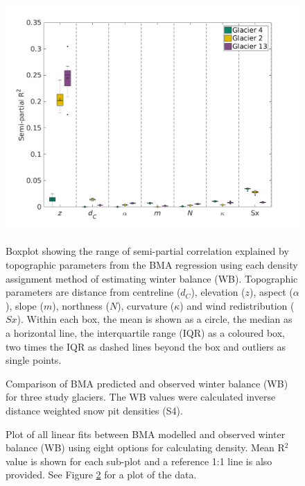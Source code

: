 \documentclass{sfuthesis}
\newcommand{\params}{Topographic parameters are distance from centreline ($d_C$), elevation ($z$), aspect ($\alpha$), slope ($m$), northness ($N$), curvature ($\kappa$) and wind redistribution ($Sx$). }
\newcommand{\boxplot}{Within each box, the mean is shown as a circle, the median as a horizontal line, the interquartile range (IQR) as a coloured box, two times the IQR as dashed lines beyond the box and outliers as single points. }
\begin{document}
\begin{figure}
	\centering
	\includegraphics[width =1.1 \textwidth]{BMSsemiR2_DensityOpts.png}\\
	\caption{Boxplot showing the range of semi-partial correlation explained by topographic parameters from the BMA regression using each density assignment method of estimating winter balance (WB). \params \boxplot }
	\label{fig:BMAsemiR2_densityOptions}
\end{figure} 
 
\begin{figure}
	\caption{Comparison of BMA predicted and observed winter balance (WB) for three study glaciers. The WB values were calculated inverse distance weighted snow pit densities (S4).}
	\label{fig:BMSfit_opt8}
\end{figure}

\begin{figure}
	\caption{Plot of all linear fits between BMA modelled and observed winter balance (WB) using eight options for calculating density. Mean R$^2$ value is shown for each sub-plot and a reference 1:1 line is also provided. See Figure \ref{fig:BMSfit_opt8} for a plot of the data. }
	\label{fig:BMSfit_allLines}
\end{figure}
\end{document}
